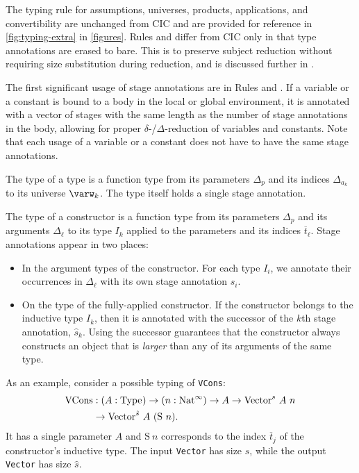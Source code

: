 \documentclass[sigplan,10pt,anonymous,review]{acmart}
\begin{document}
The typing rule for assumptions, universes, products, applications, and convertibility are unchanged from CIC and are provided for reference in \autoref{fig:typing-extra} in \autoref{figures}. Rules  and  differ from CIC only in that type annotations are erased to bare. This is to preserve subject reduction without requiring size substitution during reduction, and is discussed further in \cite{cic-hat-bar}.

The first significant usage of stage annotations are in Rules  and . If a variable or a constant is bound to a body in the local or global environment, it is annotated with a vector of stages with the same length as the number of stage annotations in the body, allowing for proper $\delta$-/$\Delta$-reduction of variables and constants. Note that each usage of a variable or a constant does not have to have the same stage annotations.

The type of a \coinductive type is a function type from its parameters $\Delta_p$ and its indices $\Delta_{a_k}$ to its universe $\varw_k$. The \coinductive type itself holds a single stage annotation.

The type of a constructor is a function type from its parameters $\Delta_p$ and its arguments $\Delta_\ell$ to its \coinductive type $I_k$ applied to the parameters and its indices $\overline{t}_\ell$. Stage annotations appear in two places:
\begin{itemize}
    \item In the argument types of the constructor. For each \coinductive type $I_i$, we annotate their occurrences in $\Delta_\ell$ with its own stage annotation $s_i$.
    \item On the \coinductive type of the fully-applied constructor. If the constructor belongs to the inductive type $I_k$, then it is annotated with the successor of the $k$th stage annotation, $\hat{s}_k$. Using the successor guarantees that the constructor always constructs an object that is \textit{larger} than any of its arguments of the same type.
\end{itemize}
As an example, consider a possible typing of \texttt{VCons}:
\begin{align*}
\text{VCons} &: (A: \text{Type}_{}) \to (n:\text{Nat}^\infty) \to A \to \text{Vector}^s\ A\ n \\
&\to \text{Vector}^{\hat{s}}\ A\ (\text{S}\ n).
\end{align*}
It has a single parameter $A$ and $\text{S}\ n$ corresponds to the index $\overline{t}_j$ of the constructor's inductive type. The input \texttt{Vector} has size $s$, while the output \texttt{Vector} has size $\hat{s}$.
\end{document}
